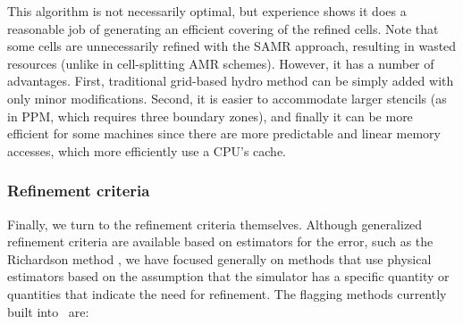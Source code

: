 This algorithm is not necessarily optimal, but experience shows it does a reasonable job of generating an efficient covering of the refined cells.  Note that some cells are unnecessarily refined with the SAMR approach, resulting in wasted resources (unlike in cell-splitting AMR schemes).  However, it has a number of advantages.  First, traditional grid-based hydro method can be simply added with only minor modifications.  Second, it is easier to accommodate larger stencils (as in PPM, which requires three boundary zones), and finally it can be more efficient for some machines since there are more predictable and linear memory accesses, which more efficiently use a CPU's cache.


\subsubsection{Refinement criteria}
\label{sec:refinement_criteria}

Finally, we turn to the refinement criteria themselves.  Although generalized refinement criteria are available based on estimators for the error, such as the Richardson method , we have focused generally on methods that use physical estimators based on the assumption that the simulator has a specific quantity or quantities that indicate the need for refinement.  The flagging methods currently built into \enzo\ are:


